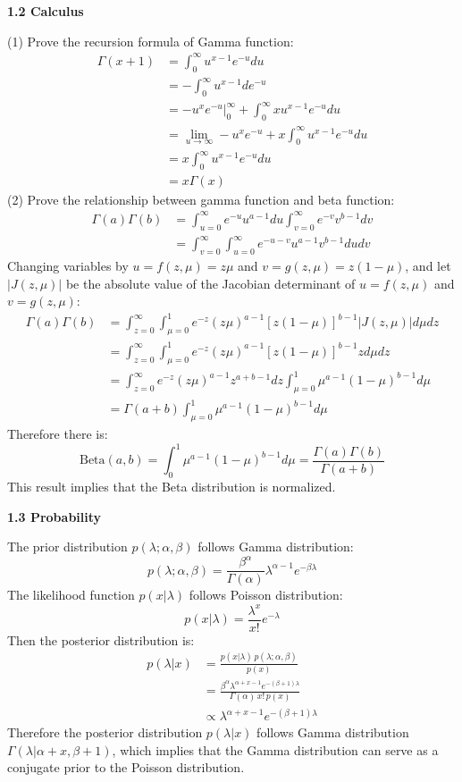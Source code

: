 \documentclass[12pt]{article}
\begin{document}
\bigskip
{\large \bf 1.2 Calculus}
\par
(1) Prove the recursion formula of Gamma function:
\begin{align*}
\Gamma(x+1)&=\int_{0}^{\infty}u^{x-1}e^{-u}du\\
&=-\int_{0}^{\infty}u^{x-1}de^{-u}\\
&=\left.-u^x e^{-u}\right|_0^\infty+\int_{0}^{\infty}x u^{x-1}e^{-u}du\\
&=\lim_{u\rightarrow\infty}-u^x e^{-u}+x\int_{0}^{\infty}u^{x-1}e^{-u}du\\
&=x\int_{0}^{\infty}u^{x-1}e^{-u}du\\
&=x\Gamma(x)
\end{align*}
(2) Prove the relationship between gamma function and beta function:
\begin{align*}
\Gamma(a)\Gamma(b)&=\int_{u=0}^{\infty}e^{-u}u^{a-1}du\int_{v=0}^{\infty}e^{-v}v^{b-1}dv\\
&=\int_{v=0}^{\infty}\int_{u=0}^{\infty}e^{-u-v}u^{a-1}v^{b-1}dudv
\end{align*}
Changing variables by $u=f(z,\mu)=z\mu$ and $v=g(z,\mu)=z(1-\mu)$, and let $|J(z,\mu)|$ be the absolute value of the Jacobian determinant of $u=f(z,\mu)$ and $v=g(z,\mu)$:
\begin{align*}
\Gamma(a)\Gamma(b)&=\int_{z=0}^{\infty}\int_{\mu=0}^{1}e^{-z}(z\mu)^{a-1}[z(1-\mu)]^{b-1}|J(z,\mu)|d\mu dz\\
&=\int_{z=0}^{\infty}\int_{\mu=0}^{1}e^{-z}(z\mu)^{a-1}[z(1-\mu)]^{b-1}z d\mu dz\\
&=\int_{z=0}^{\infty}e^{-z}(z\mu)^{a-1}z^{a+b-1}dz\int_{\mu=0}^{1}\mu^{a-1}(1-\mu)^{b-1}d\mu\\
&=\Gamma(a+b)\int_{\mu=0}^{1}\mu^{a-1}(1-\mu)^{b-1}d\mu
\end{align*}
Therefore there is:
$$\mathrm{Beta}(a,b)=\int_{0}^{1}\mu^{a-1}(1-\mu)^{b-1}d\mu=\frac{\Gamma(a)\Gamma(b)}{\Gamma(a+b)}$$
This result implies that the Beta distribution is normalized.

\bigskip
{\large \bf 1.3 Probability}
\par
The prior distribution $p(\lambda;\alpha,\beta)$ follows Gamma distribution:
$$p(\lambda;\alpha,\beta)=\frac{\beta^\alpha}{\Gamma(\alpha)}\lambda^{\alpha-1}e^{-\beta\lambda}$$
The likelihood function $p(x|\lambda)$ follows Poisson distribution:
$$p(x|\lambda)=\frac{\lambda^x}{x!}e^{-\lambda}$$
Then the posterior distribution is:
\begin{align*}
p(\lambda|x)&=\frac{p(x|\lambda)\,p(\lambda;\alpha,\beta)}{p(x)}\\
&=\frac{\beta^\alpha\lambda^{\alpha+x-1}e^{-(\beta+1)\lambda}}{\Gamma(\alpha)\,x!\,p(x)}\\
&\propto \lambda^{\alpha+x-1}e^{-(\beta+1)\lambda}
\end{align*}
Therefore the posterior distribution $p(\lambda|x)$ follows Gamma distribution $\Gamma(\lambda|\alpha+x,\beta+1)$, which implies that the Gamma distribution can serve as a conjugate prior to the Poisson distribution.
\end{document}
